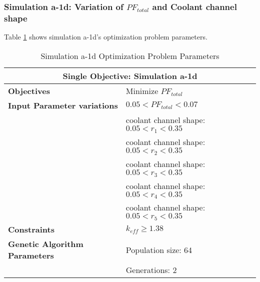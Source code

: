 \subsubsection{Simulation a-1d: Variation of $PF_{total}$ and Coolant channel shape}
Table \ref{tab:simulationa1d} shows simulation a-1d's optimization problem parameters. 
\begin{table}[htbp!]
    \centering
    \onehalfspacing
    \caption{Simulation a-1d Optimization Problem Parameters}
	\label{tab:simulationa1d}
    \footnotesize
    \begin{tabular}{l|p{6cm}}
    \hline 
    \multicolumn{2}{c}{\textbf{Single Objective: Simulation a-1d}} \\
    \hline 
    \textbf{Objectives} & Minimize $PF_{total}$ \\
    \hline 
    \textbf{Input Parameter variations} & $0.05<PF_{total}<0.07$ \\
    & coolant channel shape: $0.05<r_{1}<0.35$ \\
    & coolant channel shape: $0.05<r_{2}<0.35$ \\
    & coolant channel shape: $0.05<r_{3}<0.35$ \\
    & coolant channel shape: $0.05<r_{4}<0.35$ \\
    & coolant channel shape: $0.05<r_{5}<0.35$ \\
    \hline
    \textbf{Constraints} & $k_{eff} \geq 1.38$\\ 
    \hline 
    \textbf{Genetic Algorithm Parameters} & Population size: 64 \\
    & Generations: 2 \\
    \hline
    \end{tabular}
\end{table}

